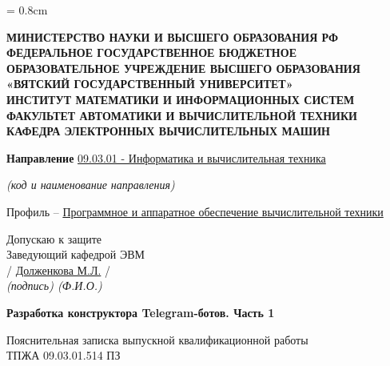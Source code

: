\begin{titlepage}
	\newpage
	\singlespacing
	\topskip = 0.8cm
	\large

	\begin{center}
		\large
		\bfseries
		МИНИСТЕРСТВО НАУКИ И ВЫСШЕГО ОБРАЗОВАНИЯ РФ \\
		ФЕДЕРАЛЬНОЕ ГОСУДАРСТВЕННОЕ БЮДЖЕТНОЕ \\
		ОБРАЗОВАТЕЛЬНОЕ УЧРЕЖДЕНИЕ ВЫСШЕГО ОБРАЗОВАНИЯ \\
		«ВЯТСКИЙ ГОСУДАРСТВЕННЫЙ УНИВЕРСИТЕТ» \\
		ИНСТИТУТ МАТЕМАТИКИ И ИНФОРМАЦИОННЫХ СИСТЕМ \\
		ФАКУЛЬТЕТ АВТОМАТИКИ И ВЫЧИСЛИТЕЛЬНОЙ ТЕХНИКИ \\
		КАФЕДРА ЭЛЕКТРОННЫХ ВЫЧИСЛИТЕЛЬНЫХ МАШИН
	\end{center}

	\vspace{0.8cm}
	\begin{center}
		\textbf{Направление}
		\uline{09.03.01 - Информатика и вычислительная техника}

		\small
		\textit{(код и наименование направления)}

		\large
		Профиль – \uline{Программное и аппаратное обеспечение вычислительной техники}
	\end{center}

	\vspace{0.8cm}
	\begin{flushright}
		Допускаю к защите \\
		Заведующий кафедрой ЭВМ \\
		\vspace{1mm}
		\uline{\hspace{3cm}} / \uline{Долженкова М.Л.} / \\
		\vspace{1mm}
		\small
		\itshape
		(подпись) \hspace{1.8cm} (Ф.И.О.) \hspace{1.4cm}

	\end{flushright}

	\vspace{1.5cm}
	\begin{center}
		\huge
		\bfseries
		Разработка конструктора Telegram-ботов. Часть 1
	\end{center}

	\vspace{0.5cm}
	\begin{center}
		Пояснительная записка выпускной квалификационной работы \\
		ТПЖА 09.03.01.514 ПЗ
	\end{center}


\end{titlepage}
